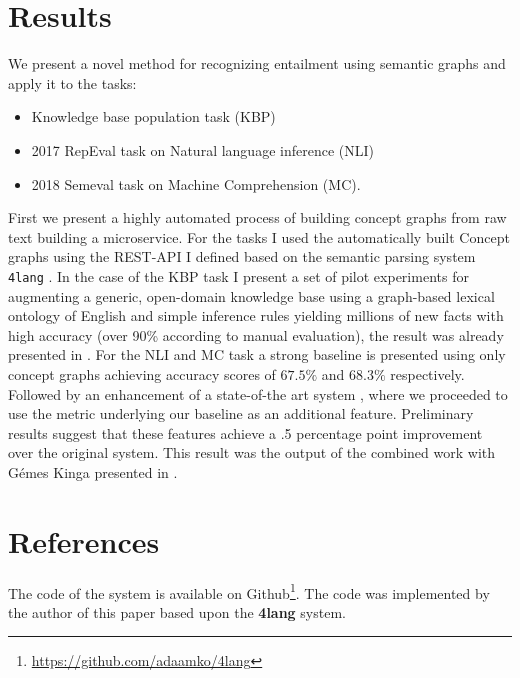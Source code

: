\section{Results}
We present a novel method for recognizing entailment using semantic
graphs and apply it to the tasks:
\begin{itemize}
    \item Knowledge base population task (KBP)
    \item 2017 RepEval task on Natural language inference (NLI)
    \item 2018 Semeval task on Machine
    Comprehension (MC).
\end{itemize}
First we present a highly automated process of building concept graphs from raw text building a microservice.
For the tasks I used the automatically built Concept graphs using the REST-API I defined based on the semantic parsing system \texttt{4lang} \cite{Recski:2016d}.
In the case of the KBP task I present a set of pilot experiments for augmenting a generic, open-domain 
knowledge base using a graph-based lexical ontology of English and simple
inference rules yielding millions of new facts with high
accuracy (over 90\% according to manual evaluation), the result was already presented in \cite{Kovacs:2018}.
For the NLI and MC task a strong baseline is presented using only concept graphs achieving accuracy scores of $67.5\%$ and $68.3\%$ respectively.
Followed by an enhancement of a state-of-the art system
\cite{Wang:2018}, where we proceeded to use the metric underlying our baseline as an additional feature. Preliminary results suggest that these features achieve a .5 percentage point improvement over the original system. This result was the output of the combined work with G\'emes Kinga presented in \cite{Kovacs:2018b}.

\section{References}
The code of the system is available on Github\footnote{\url{https://github.com/adaamko/4lang}}. The code was implemented by the author of this paper based upon the \textbf{4lang} system.

